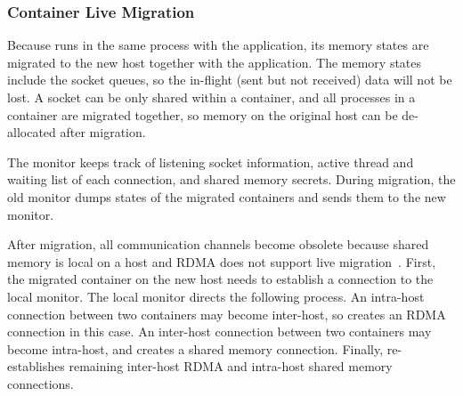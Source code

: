 

\subsubsection{Container Live Migration}
\label{subsubsec:container_live_migration}
\quad

Because \libipc{} runs in the same process with the application, its memory states are migrated to the new host together with the application.
The memory states include the socket queues, so the in-flight (sent but not received) data will not be lost.
A socket can be only shared within a container, and all processes in a container are migrated together, so memory on the original host can be de-allocated after migration.

The monitor keeps track of listening socket information, active thread and waiting list of each connection, and shared memory secrets.
During migration, the old monitor dumps states of the migrated containers and sends them to the new monitor.

After migration, all communication channels become obsolete because shared memory is local on a host and RDMA does not support live migration~\cite{nsdi19freeflow,slim}.
First, the migrated container on the new host needs to establish a connection to the local monitor.
The local monitor directs the following process.
An intra-host connection between two containers may become inter-host, so \libipc{} creates an RDMA connection in this case.
An inter-host connection between two containers may become intra-host, and \libipc{} creates a shared memory connection.
Finally, \libipc{} re-establishes remaining inter-host RDMA and intra-host shared memory connections.



